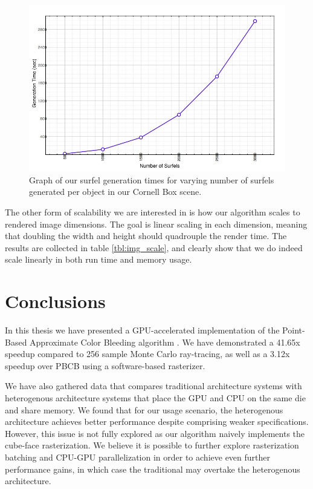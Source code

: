 \begin{figure}[h!]
    \centering
    \includegraphics[width=150mm]{../img/surfel_gen_graph.png}
    \caption[Surfel Generation Time Graph]{Graph of our surfel generation times for varying number of surfels generated per object in our Cornell Box scene.}
    \label{fig:surfel_gen_times_graph}
\end{figure}

The other form of scalability we are interested in is how our algorithm scales to rendered image dimensions. The goal is linear scaling in each dimension, meaning that doubling the width and height should quadrouple the render time. The results are collected in table \ref{tbl:img_scale}, and clearly show that we do indeed scale linearly in both run time and memory usage.

\section{Conclusions}
In this thesis we have presented a GPU-accelerated implementation of the Point-Based Approximate Color Bleeding algorithm \cite{bib:christensen2008}. We have demonstrated a 41.65x speedup compared to 256 sample Monte Carlo ray-tracing, as well as a 3.12x speedup over PBCB using a software-based rasterizer.

We have also gathered data that compares traditional architecture systems with heterogenous architecture systems that place the GPU and CPU on the same die and share memory. We found that for our usage scenario, the heterogenous architecture achieves better performance despite comprising weaker specifications. However, this issue is not fully explored as our algorithm naively implements the cube-face rasterization. We believe it is possible to further explore rasterization batching and CPU-GPU parallelization in order to achieve even further performance gains, in which case the traditional may overtake the heterogenous architecture.

